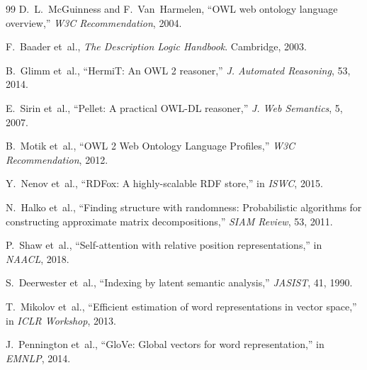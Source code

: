 \documentclass[conference]{IEEEtran}
\begin{document}
\begin{thebibliography}{99}
D.~L.~McGuinness and F.~Van~Harmelen, ``OWL web ontology language overview,'' \emph{W3C Recommendation}, 2004.

F.~Baader et~al., \emph{The Description Logic Handbook}. Cambridge, 2003.

B.~Glimm et~al., ``HermiT: An OWL 2 reasoner,'' \emph{J. Automated Reasoning}, 53, 2014.

E.~Sirin et~al., ``Pellet: A practical OWL-DL reasoner,'' \emph{J. Web Semantics}, 5, 2007.

B.~Motik et~al., ``OWL 2 Web Ontology Language Profiles,'' \emph{W3C Recommendation}, 2012.

Y.~Nenov et~al., ``RDFox: A highly-scalable RDF store,'' in \emph{ISWC}, 2015.

N.~Halko et~al., ``Finding structure with randomness: Probabilistic algorithms for constructing approximate matrix decompositions,'' \emph{SIAM Review}, 53, 2011.

P.~Shaw et~al., ``Self-attention with relative position representations,'' in \emph{NAACL}, 2018.

S.~Deerwester et~al., ``Indexing by latent semantic analysis,'' \emph{JASIST}, 41, 1990.

T.~Mikolov et~al., ``Efficient estimation of word representations in vector space,'' in \emph{ICLR Workshop}, 2013.

J.~Pennington et~al., ``GloVe: Global vectors for word representation,'' in \emph{EMNLP}, 2014.

\end{thebibliography}
\end{document}
